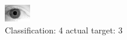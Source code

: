 \begin{figure}[h!]
\begin{center}
\includegraphics[width=0.60\columnwidth]{figures/ID2157_class_4_target_3.png}
\end{center}
\caption{ Classification: 4 actual target: 3}
\label{fig:ID2157_class_4_target_3}
\end{figure}
